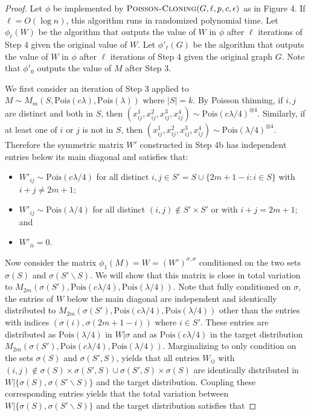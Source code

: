 \documentclass[11pt]{article}
\begin{document}
\begin{proof}
Let $\phi$ be implemented by $\textsc{Poisson-Cloning}(G, \ell, p, c, \epsilon)$ as in Figure 4. If $\ell = O(\log n)$, this algorithm runs in randomized polynomial time. Let $\phi_\ell(W)$ be the algorithm that outputs the value of $W$ in $\phi$ after $\ell$ iterations of Step 4 given the original value of $W$. Let $\phi'_\ell(G)$ be the algorithm that outputs the value of $W$ in $\phi$ after $\ell$ iterations of Step 4 given the original graph $G$. Note that $\phi'_0$ outputs the value of $M$ after Step 3.

We first consider an iteration of Step 3 applied to $M \sim M_m(S, \text{Pois}(c\lambda), \text{Pois}(\lambda))$ where $|S| = k$. By Poisson thinning, if $i, j$ are distinct and both in $S$, then $(x^1_{ij}, x^2_{ij}, x^3_{ij}, x^4_{ij}) \sim \text{Pois}(c\lambda/4)^{\otimes 4}$. Similarly, if at least one of $i$ or $j$ is not in $S$, then $(x^1_{ij}, x^2_{ij}, x^3_{ij}, x^4_{ij}) \sim \text{Pois}(\lambda/4)^{\otimes 4}$. Therefore the symmetric matrix $W'$ constructed in Step 4b has independent entries below its main diagonal and satisfies that:
\begin{itemize}
\item $W'_{ij} \sim \text{Pois}(c\lambda/4)$ for all distinct $i, j \in S' = S \cup \{ 2m + 1 - i : i \in S\}$ with $i + j \neq 2m + 1$;
\item $W'_{ij} \sim \text{Pois}(\lambda/4)$ for all distinct $(i, j) \not \in S' \times S'$ or with $i + j = 2m + 1$; and
\item $W'_{ii} = 0$.
\end{itemize}
Now consider the matrix $\phi_1(M) = W = (W')^{\sigma, \sigma}$ conditioned on the two sets $\sigma(S)$ and $\sigma(S' \backslash S)$. We will show that this matrix is close in total variation to $M_{2m}(\sigma(S'), \text{Pois}(c\lambda/4), \text{Pois}(\lambda/4))$. Note that fully conditioned on $\sigma$, the entries of $W$ below the main diagonal are independent and identically distributed to $M_{2m}(\sigma(S'), \text{Pois}(c\lambda/4), \text{Pois}(\lambda/4))$ other than the entries with indices $(\sigma(i), \sigma(2m + 1 - i))$ where $i \in S'$. These entries are distributed as $\text{Pois}(\lambda/4)$ in $W | \sigma$ and as $\text{Pois}(c\lambda/4)$ in the target distribution $M_{2m}(\sigma(S'), \text{Pois}(c\lambda/4), \text{Pois}(\lambda/4))$. Marginalizing to only condition on the sets $\sigma(S)$ and $\sigma(S', S)$, yields that all entries $W_{ij}$ with $(i, j) \not \in \sigma(S) \times \sigma(S', S) \cup \sigma(S', S) \times \sigma(S)$ are identically distributed in $W | \{ \sigma(S), \sigma(S' \backslash S)\}$ and the target distribution. Coupling these corresponding entries yields that the total variation between $W | \{ \sigma(S), \sigma(S' \backslash S)\}$ and the target distribution satisfies that

\end{proof}
\end{document}
